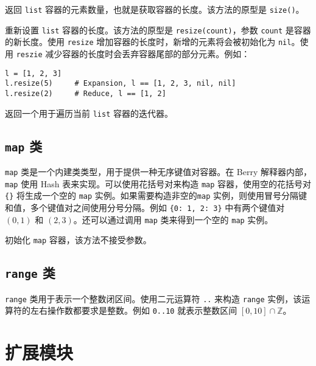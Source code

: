 
返回 \texttt{list} 容器的元素数量，也就是获取容器的长度。该方法的原型是 \texttt{size()}。


重新设置 \texttt{list} 容器的长度。该方法的原型是 \texttt{resize(count)}，参数 \texttt{count} 是容器的新长度。使用 \texttt{resize} 增加容器的长度时，新增的元素将会被初始化为 \texttt{nil}。使用 \texttt{reszie} 减少容器的长度时会丢弃容器尾部的部分元素。例如：
\begin{lstlisting}[language=berry, numbers=none]
l = [1, 2, 3]
l.resize(5)     # Expansion, l == [1, 2, 3, nil, nil]
l.resize(2)     # Reduce, l == [1, 2]
\end{lstlisting}


返回一个用于遍历当前 \texttt{list} 容器的迭代器。

\subsection{\texttt{map} 类}

\texttt{map} 类是一个内建类类型，用于提供一种无序键值对容器。在 Berry 解释器内部，\texttt{map} 使用 Hash 表来实现。可以使用花括号对来构造 \texttt{map} 容器，使用空的花括号对 \texttt{\{\}} 将生成一个空的 \texttt{map} 实例。如果需要构造非空的\texttt{map} 实例，则使用冒号分隔键和值，多个键值对之间使用分号分隔。例如 \texttt{\{0: 1, 2: 3\}} 中有两个键值对 $(0, 1)$ 和 $(2, 3)$。还可以通过调用 \texttt{map} 类来得到一个空的 \texttt{map} 实例。


初始化 \texttt{map} 容器，该方法不接受参数。

\subsection{\texttt{range} 类}

\texttt{range} 类用于表示一个整数闭区间。使用二元运算符 \texttt{..} 来构造 \texttt{range} 实例，该运算符的左右操作数都要求是整数。例如 \texttt{0..10} 就表示整数区间 $[0,10]\cap\mathbb{Z}$。

\section{扩展模块}
